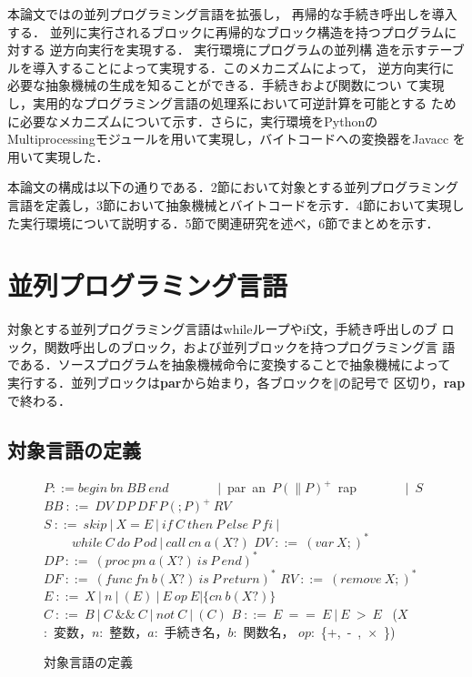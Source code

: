 \documentclass[submit,PRO]{ipsj}
\begin{document}
本論文では\cite{DBLP:conf/rc/IkedaY20}の並列プログラミング言語を拡張し，
再帰的な手続き呼出しを導入する．
並列に実行されるブロックに再帰的なブロック構造を持つプログラムに対する
逆方向実行を実現する．%
実行環境にプログラムの並列構
造を示すテーブルを導入することによって実現する．このメカニズムによって，
逆方向実行に必要な抽象機械の生成を知ることができる．手続きおよび関数につい
て実現し，実用的なプログラミング言語の処理系において可逆計算を可能とする
ために必要なメカニズムについて示す．さらに，実行環境をPythonの
Multiprocessingモジュールを用いて実現し，バイトコードへの変換器をJavacc
を用いて実現した．

本論文の構成は以下の通りである．2節において対象とする並列プログラミング
言語を定義し，3節において抽象機械とバイトコードを示す．4節において実現し
た実行環境について説明する．5節で関連研究を述べ，6節でまとめを示す．

\section{並列プログラミング言語}

対象とする並列プログラミング言語はwhileループやif文，手続き呼出しのブ
ロック，関数呼出しのブロック，および並列ブロックを持つプログラミング言
語である．ソースプログラムを抽象機械命令に変換することで抽象機械によって
実行する．並列ブロックは{\bf par}から始まり，各ブロックを$\Vert$の記号で
区切り，{\bf rap}で終わる．

\subsection{対象言語の定義}
\label{sec:3.1}

\begin{figure}[tb]
\vbox{
\hbox{$P ::= begin\ bn\ BB\ end$}
\hbox{\ \ \ \ \ \ \ $\vert$ par an $P(\parallel P)^+$ rap}
\hbox{\ \ \ \ \ \ \ $\vert$ $S$}
\hbox{$BB\ ::=\ DV\ DP\ DF\ P(;P)^+\ RV$}
\hbox{$S\ ::=\ skip\ \vert\  X = E\ \vert\ if\ C\ then\ P\ else\ P\ fi\ \vert$}
\hbox{$\ \ \ \ \ \ \ \ \ \  while\ C\ do\ P\ od\ \vert\ call\ cn\ a(X?)$}
\hbox{$DV\ ::=\ (var\ X;)^*$}
\hbox{$DP\ ::=\ (proc\ pn\ a(X?)\ is\ P\ end)^*$}
\hbox{$DF\ ::=\ (func\ fn\ b(X?)\ is\ P\ return)^*$}
\hbox{$RV\ ::=\ (remove\ X;)^*$}
\hbox{$E\ ::=\ X\ \vert\ n\ \vert\ (E)\ \vert\ E\ op\ E \vert \{cn\ b(X?)\}$}
\hbox{$C\ ::=\ B\ \vert\ C\ \&\& \ C\ \vert\ not\ C\ \vert\ (C)$}
\hbox{$B\ ::=\ E\ ==\ E\ \vert \ E\ >\ E$}
\hbox{\\}
\hbox{ ($X$: 変数，$n$: 整数，$a$: 手続き名，$b$: 関数名，}
\hbox{$op$: \{+, - , $\times$ \})}
}
\centerline{}
\caption{対象言語の定義}
\label{fig:def}
\end{figure}
\end{document}
